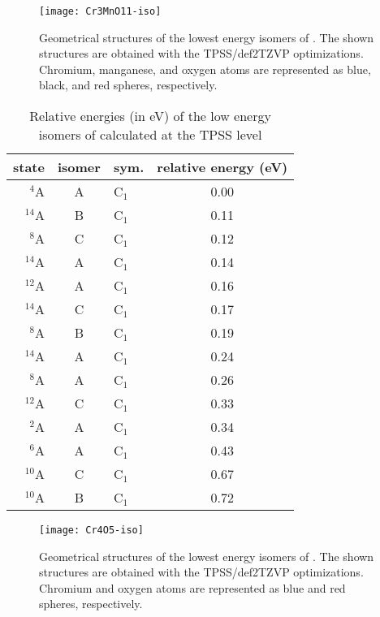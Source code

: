 \begin{figure}
	\centering
	\texttt{[image: Cr3MnO11-iso]}
	\caption{Geometrical structures of the lowest energy isomers of . The shown structures are obtained with the TPSS/def2TZVP optimizations. Chromium, manganese, and oxygen atoms are represented as blue, black, and red spheres, respectively.}
	\label{figs:Cr3MnO11}
\end{figure}







\begin{table}[]
	\centering
	\caption{Relative energies (in eV) of the low energy isomers of  calculated at the TPSS level}
	\begin{tabular}{@{}rclc@{}}
	\toprule
	state & isomer & sym. & relative energy (eV) \\ \midrule
	$^4$A      & A      & C$_1$   & 0.00                 \\
	$^{14}$A   & B      & C$_1$   & 0.11                 \\
	$^8$A      & C      & C$_1$   & 0.12                 \\
	$^{14}$A   & A      & C$_1$   & 0.14                 \\
	$^{12}$A   & A      & C$_1$   & 0.16                 \\
	$^{14}$A   & C      & C$_1$   & 0.17                 \\
	$^8$A      & B      & C$_1$   & 0.19                 \\
	$^{14}$A   & A      & C$_1$   & 0.24                 \\
	$^8$A      & A      & C$_1$   & 0.26                 \\
	$^{12}$A     & C      & C$_1$   & 0.33                 \\
	$^2$A      & A      & C$_1$   & 0.34                 \\
	$^6$A      & A      & C$_1$   & 0.43                 \\
	$^{10}$A   & C      & C$_1$   & 0.67                 \\
	$^{10}$A   & B      & C$_1$   & 0.72                 \\ \bottomrule
	\end{tabular}
\end{table}


\begin{figure}
	\centering
	\texttt{[image: Cr4O5-iso]}
	\caption{Geometrical structures of the lowest energy isomers of . The shown structures are obtained with the TPSS/def2TZVP optimizations. Chromium and oxygen atoms are represented as blue and red spheres, respectively.}
	\label{figs:Cr4O5}
\end{figure}


